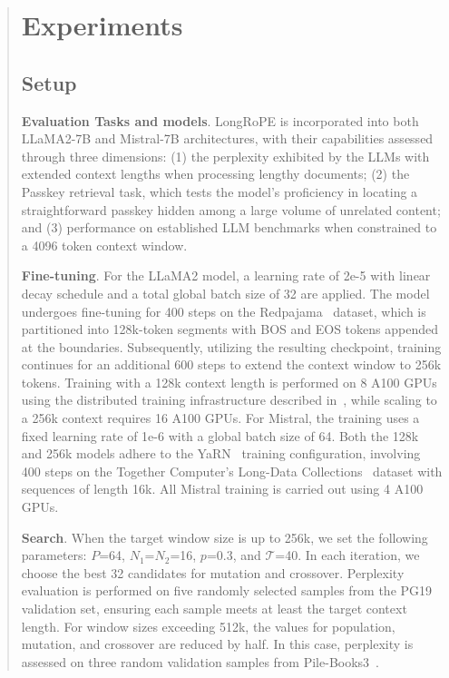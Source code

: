 \begin{abstract}
 \section{Experiments}

\label{sec:exp}
\subsection{Setup}
\textbf{Evaluation Tasks and models}. LongRoPE is incorporated into both LLaMA2-7B and Mistral-7B architectures, with their capabilities assessed through three dimensions: (1) the perplexity exhibited by the LLMs with extended context lengths when processing lengthy documents; (2) the Passkey retrieval task, which tests the model's proficiency in locating a straightforward passkey hidden among a large volume of unrelated content; and (3) performance on established LLM benchmarks when constrained to a 4096 token context window.

\textbf{Fine-tuning}. For the LLaMA2 model, a learning rate of 2e-5 with linear decay schedule and a total global batch size of 32 are applied. The model undergoes fine-tuning for 400 steps on the Redpajama~\cite{redpajama} dataset, which is partitioned into 128k-token segments with BOS and EOS tokens appended at the boundaries. Subsequently, utilizing the resulting checkpoint, training continues for an additional 600 steps to extend the context window to 256k tokens. Training with a 128k context length is performed on 8 A100 GPUs using the distributed training infrastructure described in~\cite{cube}, while scaling to a 256k context requires 16 A100 GPUs. For Mistral, the training uses a fixed learning rate of 1e-6 with a global batch size of 64. Both the 128k and 256k models adhere to the YaRN~\cite{yarn} training configuration, involving 400 steps on the Together Computer's Long-Data Collections~\cite{mistraldata} dataset with sequences of length 16k. All Mistral training is carried out using 4 A100 GPUs.

\textbf{Search}. When the target window size is up to 256k, we set the following parameters: $P$=64, $N_1$=$N_2$=16, $p$=0.3, and $\mathcal{T}$=40. In each iteration, we choose the best 32 candidates for mutation and crossover. Perplexity evaluation is performed on five randomly selected samples from the PG19 validation set, ensuring each sample meets at least the target context length. For window sizes exceeding 512k, the values for population, mutation, and crossover are reduced by half. In this case, perplexity is assessed on three random validation samples from Pile-Books3~\cite{pile}.


\end{abstract}
